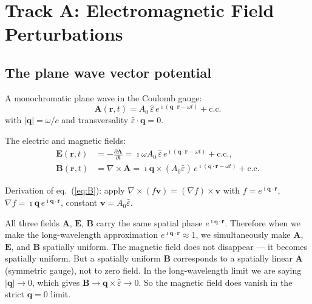 \documentclass[11pt]{article}
\newcommand{\iunit}{\imath}
\newcommand{\Avec}{\mathbf{A}}
\newcommand{\Evec}{\mathbf{E}}
\newcommand{\Bvec}{\mathbf{B}}
\begin{document}
\section{Track A: Electromagnetic Field Perturbations}

\subsection{The plane wave vector potential}

A monochromatic plane wave in the Coulomb gauge:
\begin{equation}
  \Avec(\mathbf{r},t)
  = A_0\,\hat{\varepsilon}\,
    e^{\iunit(\mathbf{q}\cdot\mathbf{r}-\omega t)}
    + \text{c.c.}
  \label{eq:A}
\end{equation}
with $|\mathbf{q}|=\omega/c$ and transversality
$\hat{\varepsilon}\cdot\mathbf{q}=0$.

The electric and magnetic fields:
\begin{align}
  \Evec(\mathbf{r},t)
  &= -\frac{\partial\Avec}{\partial t}
   = \iunit\omega A_0\,\hat{\varepsilon}\,
     e^{\iunit(\mathbf{q}\cdot\mathbf{r}-\omega t)}
     + \text{c.c.},
  \label{eq:E}
  \\
  \Bvec(\mathbf{r},t)
  &= \nabla\times\Avec
   = \iunit\mathbf{q}\times
     (A_0\hat{\varepsilon})\,
     e^{\iunit(\mathbf{q}\cdot\mathbf{r}-\omega t)}
     + \text{c.c.}
  \label{eq:B}
\end{align}

Derivation of eq.~(\ref{eq:B}): apply
$\nabla\times(f\mathbf{v})=(\nabla f)\times\mathbf{v}$ with
$f=e^{\iunit\mathbf{q}\cdot\mathbf{r}}$,
$\nabla f = \iunit\mathbf{q}\,e^{\iunit\mathbf{q}\cdot\mathbf{r}}$,
constant $\mathbf{v}=A_0\hat{\varepsilon}$.

\begin{physics}
All three fields $\Avec$, $\Evec$, $\Bvec$ carry the same spatial
phase $e^{\iunit\mathbf{q}\cdot\mathbf{r}}$.
Therefore when we make the long-wavelength approximation
$e^{\iunit\mathbf{q}\cdot\mathbf{r}}\approx1$, we simultaneously
make $\Avec$, $\Evec$, and $\Bvec$ spatially uniform.
The magnetic field does not disappear --- it becomes spatially
uniform.
But a spatially uniform $\Bvec$ corresponds to a spatially linear
$\Avec$ (symmetric gauge), not to zero field.
In the long-wavelength limit we are saying $|\mathbf{q}|\to0$,
which gives $\Bvec\to\mathbf{q}\times\hat{\varepsilon}\to0$.
So the magnetic field does vanish in the strict $\mathbf{q}=0$ limit.
\end{physics}
\end{document}
